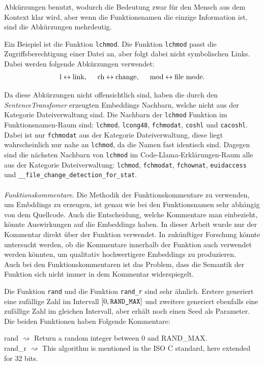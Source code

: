 \documentclass[12pt,letterpaper,ngerman]{article}
\begin{document}
Abkürzungen benutzt, wodurch die Bedeutung zwar für den Mensch 
aus dem Kontext klar wird, aber wenn die Funktionsnamen 
die einzige Information ist, sind die Abkürzungen mehrdeutig.
\begin{example}
  Ein Beispiel ist die Funktion
  \verb|lchmod|. Die Funktion \verb|lchmod| passt die
  Zugriffsberechtigung einer Datei an, aber folgt dabei nicht
  symbolischen Links. Dabei werden folgende Abkürzungen verwendet:
  \begin{align*}
    \text{l} \leftrightarrow \text{link}, \hspace{0.5cm}
    \text{ch} \leftrightarrow \text{change},\hspace{0.5cm}
    \text{mod} \leftrightarrow \text{file mode}.
  \end{align*}
\end{example}
Da diese Abkürzungen nicht offensichtlich sind,
haben die durch den \textit{SentenceTransfomer} 
erzeugten Embeddings Nachbarn, welche nicht aus 
der Kategorie Dateiverwaltung sind. Die Nachbarn 
der \texttt{lchmod} Funktion im Funktionsnamen-Raum
sind: \texttt{lchmod}, \texttt{lcong48}, 
\texttt{fchmodat}, \texttt{coshl} und \texttt{cacoshl}. 
Dabei ist nur \texttt{fchmodat} aus der Kategorie 
Dateiverwaltung, diese liegt wahrscheinlich nur 
nahe an \texttt{lchmod},
da die Namen fast identisch sind. Dagegen sind die 
nächsten Nachbarn von \texttt{lchmod} im 
Code-Llama-Erklärungen-Raum alle aus der 
Kategorie Dateiverwaltung: 
\texttt{lchmod}, \texttt{fchmodat}, \texttt{fchownat},
\texttt{euidaccess} und
\texttt{\_\_file\_change\_detection\_for\_stat}.\\\\
\textit{Funktionskommentare}. 
Die Methodik der 
Funktionskommentare zu verwenden, um Embddings zu erzeugen,
ist genau wie bei den Funktionsnamen sehr abhängig von dem
Quellcode. Auch die Entscheidung, welche Kommentare man 
einbezieht, könnte Auswirkungen auf die Embeddings haben.
In dieser Arbeit wurde nur der Kommentar direkt über der 
Funktion verwendet. In zukünftiger Forschung könnte untersucht 
werden, ob die Kommentare innerhalb der Funktion auch verwendet 
werden könnten, um qualitativ hochwertigere Embeddings zu 
produzieren.\\
Auch bei den Funktionskommentaren ist das Problem, dass die 
Semantik der Funktion sich nicht immer in dem Kommentar
widerspiegelt.
\begin{example}
  Die Funktion \verb|rand| und die Funktion \verb|rand_r| sind 
  sehr ähnlich. Erstere generiert eine zufällige Zahl im 
  Intervall $[0, \verb|RAND_MAX|]$ und zweitere generiert 
  ebenfalls eine zufällige Zahl im gleichen Intervall, aber
  erhält noch einen Seed als Parameter. Die beiden Funktionen
  haben Folgende Kommentare:
  \begin{center}
    rand $\rightsquigarrow$ Return a random integer between 0
      and RAND\_MAX.\\
    rand\_r  $\rightsquigarrow$   This algorithm is mentioned in 
    the ISO C standard, here extended for 32 bits.
  \end{center}
\end{example}
\end{document}
